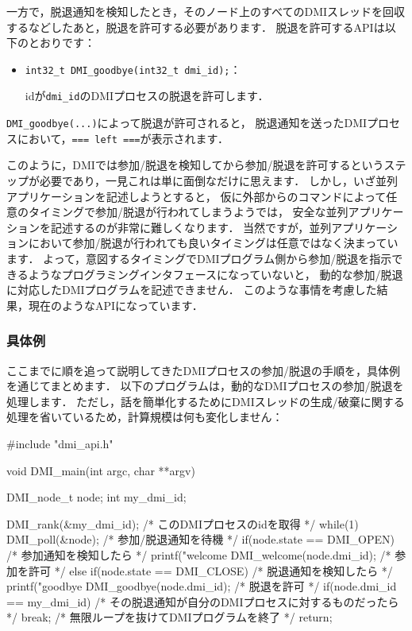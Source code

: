 \documentclass[report,12pt]{jsbook}
\begin{document}
一方で，脱退通知を検知したとき，そのノード上のすべてのDMIスレッドを回収するなどしたあと，脱退を許可する必要があります．
脱退を許可するAPIは以下のとおりです：

\begin{itemize}
\item \texttt{int32\_t DMI\_goodbye(int32\_t dmi\_id);}：
  
  idが\texttt{dmi\_id}のDMIプロセスの脱退を許可します．
\end{itemize}

\texttt{DMI\_goodbye(...)}によって脱退が許可されると，
脱退通知を送ったDMIプロセスにおいて，\texttt{=== left ===}が表示されます．

このように，DMIでは参加/脱退を検知してから参加/脱退を許可するというステップが必要であり，一見これは単に面倒なだけに思えます．
しかし，いざ並列アプリケーションを記述しようとすると，
仮に外部からのコマンドによって任意のタイミングで参加/脱退が行われてしまうようでは，
安全な並列アプリケーションを記述するのが非常に難しくなります．
当然ですが，並列アプリケーションにおいて参加/脱退が行われても良いタイミングは任意ではなく決まっています．
よって，意図するタイミングでDMIプログラム側から参加/脱退を指示できるようなプログラミングインタフェースになっていないと，
動的な参加/脱退に対応したDMIプログラムを記述できません．
このような事情を考慮した結果，現在のようなAPIになっています．

\subsubsection{具体例}

ここまでに順を追って説明してきたDMIプロセスの参加/脱退の手順を，具体例を通じてまとめます．
以下のプログラムは，動的なDMIプロセスの参加/脱退を処理します．
ただし，話を簡単化するためにDMIスレッドの生成/破棄に関する処理を省いているため，計算規模は何も変化しません：
\begin{code}
#include "dmi_api.h"

void DMI_main(int argc, char **argv)
{
  DMI_node_t node;
  int my_dmi_id;
  
  DMI_rank(&my_dmi_id);  /* このDMIプロセスのidを取得 */
  while(1)
    {
      DMI_poll(&node);  /* 参加/脱退通知を待機 */
      if(node.state == DMI_OPEN)  /* 参加通知を検知したら */
        {
          printf("welcome %
          DMI_welcome(node.dmi_id);  /* 参加を許可 */
        }
      else if(node.state == DMI_CLOSE)  /* 脱退通知を検知したら */
        {
          printf("goodbye %
          DMI_goodbye(node.dmi_id);  /* 脱退を許可 */
          if(node.dmi_id == my_dmi_id)  /* その脱退通知が自分のDMIプロセスに対するものだったら */
            {
              break;  /* 無限ループを抜けてDMIプログラムを終了 */
            }
        }
    }
  return;
}
\end{code}
\end{document}
